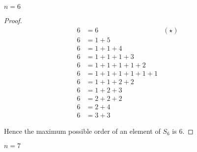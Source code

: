 \newpage
\begin{exercise}
    $n = 6$
\end{exercise}

\begin{proof}
    \begin{align*}
        6 & = 6                     & (\star) \\
        6 & = 1 + 5                           \\
        6 & = 1 + 1 + 4                       \\
        6 & = 1 + 1 + 1 + 3                   \\
        6 & = 1 + 1 + 1 + 1 + 2               \\
        6 & = 1 + 1 + 1 + 1 + 1 + 1           \\
        6 & = 1 + 1 + 2 + 2                   \\
        6 & = 1 + 2 + 3                       \\
        6 & = 2 + 2 + 2                       \\
        6 & = 2 + 4                           \\
        6 & = 3 + 3
    \end{align*}

    Hence the maximum possible order of an element of $S_{6}$ is $6$.
\end{proof}

\newpage
\begin{exercise}
    $n = 7$
\end{exercise}

